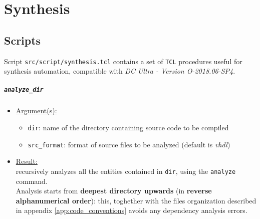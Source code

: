 \chapter{Synthesis}
\label{chap:synthesis}

\lstset{
	basicstyle=\tiny,
	frame=single,
	breaklines=true
}

\section{Scripts}
Script \texttt{src/script/synthesis.tcl} contains a set of \texttt{TCL}
procedures useful for synthesis automation, compatible with
\textit{DC Ultra - Version O-2018.06-SP4}.

\paragraph{\texttt{analyze\_dir}}
\begin{itemize}
	\item \underline{Argument(s):}
		\begin{itemize}
			\item \texttt{dir}: name of the directory containing
				source code to be compiled
			\item \texttt{src\_format}: format of source files
				to be analyzed (default is \textit{vhdl})
		\end{itemize}
	\item \underline{Result:} \\
		recursively analyzes all the entities contained in \texttt{dir},
		using the \texttt{analyze} command. \\
		Analysis starts from \textbf{deepest directory upwards} (in
		\textbf{reverse alphanumerical order}): this, toghether with the
		files organization described in appendix
		\ref{app:code_conventions} avoids any dependency analysis errors.
\end{itemize}

